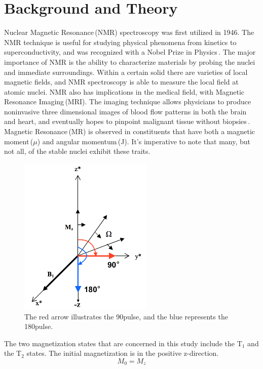 \documentclass[aps,prl,twocolumn,superscriptaddress,nofootinbib]{revtex4-1}
\begin{document}
\section{Background and Theory}
Nuclear Magnetic Resonance\,(NMR) spectroscopy was first utilized in 1946. The NMR technique is useful for studying physical phenomena from kinetics to superconductivity, and was recognized with a Nobel Prize in Physics\,\cite{1}. The major importance of NMR is the ability to characterize materials by probing the nuclei and immediate surroundings. Within a certain solid there are varieties of local magnetic fields, and NMR spectroscopy is able to measure the local field at atomic nuclei. NMR also has implications in the medical field, with Magnetic Resonance Imaging\,(MRI). The imaging technique allows physicians to produce noninvasive three dimensional images of blood flow patterns in both the brain and heart, and eventually hopes to pinpoint malignant tissue without biopsies\,\cite{2}.
\\
\indent Magnetic Resonance\,(MR) is observed in constituents that have both a magnetic moment\,($\mu$) and angular momentum\,(J). It's imperative to note that many, but not all, of the stable nuclei exhibit these traits. 

\begin{figure}[h!]
  \begin{center}
\centerline{\includegraphics[width=2.5in]{magnet.png}}
\caption{ \small{The red arrow illustrates the 90\degree pulse, and the blue represents the 180\degree pulse. \label{magnet}}}
\end{center}
\end{figure}
\vfill\eject
The two magnetization states that are concerned in this study include the T$_1$ and the T$_2$ states. The initial magnetization is in the positive z-direction.
\begin{equation}
M_0=M_z
\end{equation}
\end{document}
